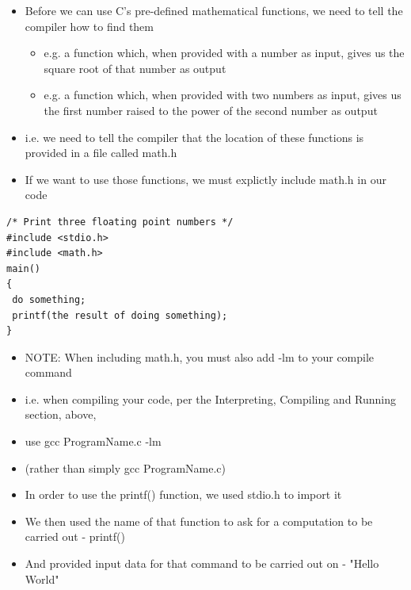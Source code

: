 \documentclass{beamer}
\begin{document}
\begin{frame}[fragile]
\begin{itemize}
\item Before we can use C's pre-defined mathematical functions, we need to tell the compiler how to find them
\begin{itemize}
\item e.g. a function which, when provided with a number as input, gives us the square root of that number as output
\item e.g. a function which, when provided with two numbers as input, gives us the first number raised to the power of the second number as output
\end{itemize}
\item i.e. we need to tell the compiler that the location of these functions is provided in a file called math.h 
\end{itemize}
\end{frame}

\begin{frame}[fragile]
\begin{itemize}
\item If we want to use those functions, we must explictly include math.h in our code
\end{itemize}
\begin{block}{}
\begin{lstlisting}
/* Print three floating point numbers */
#include <stdio.h>
#include <math.h>
main()
{
 do something;
 printf(the result of doing something);
}
\end{lstlisting}
\end{block}
\end{frame}

\begin{frame}[fragile]
\begin{itemize}
\item NOTE: When including math.h, you must also add -lm to your compile command
\item i.e. when compiling your code, per the Interpreting, Compiling and Running section, above, 
\item use gcc ProgramName.c -lm 
\item (rather than simply gcc ProgramName.c) 
\end{itemize}
\end{frame}

\begin{frame}
\begin{itemize} 
\item In order to use the printf() function, we used stdio.h to import it
\item We then used the name of that function to ask for a computation to be carried out - printf()
\item And provided input data for that command to be carried out on - "Hello World"
\end{itemize}
\end{frame}
\end{document}
